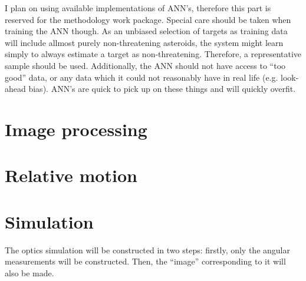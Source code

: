 \documentclass[a4paper,10pt]{article}
\begin{document}
I plan on using available implementations of ANN's, therefore this part is reserved for the methodology work package. Special care should be taken when training the ANN though. As an unbiased selection of targets as training data will include allmost purely non-threatening asteroids, the system might learn simply to always estimate a target as non-threatening. Therefore, a representative sample should be used. Additionally, the ANN should not have access to ``too good'' data, or any data which it could not reasonably have in real life (e.g. look-ahead bias). ANN's are quick to pick up on these things and will quickly overfit.

\section{Image processing}

\section{Relative motion}

\section{Simulation}
The optics simulation will be constructed in two steps: firstly, only the angular measurements will be constructed. Then, the ``image'' corresponding to it will also be made.\\
\end{document}
